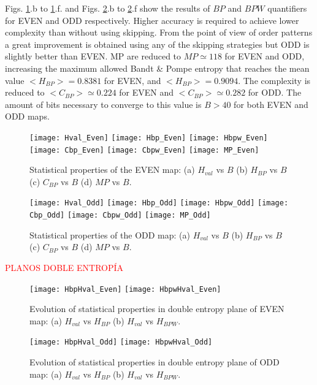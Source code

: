 Figs. \ref{fig:EVEN_QuantiB}.b to \ref{fig:EVEN_QuantiB}.f. and Figs. \ref{fig:ODD_QuantiB}.b to \ref{fig:ODD_QuantiB}.f show the results of $BP$ and $BPW$ quantifiers for EVEN and ODD respectively.
Higher accuracy is required to achieve lower complexity than without using skipping.
From the point of view of order patterns a great improvement is obtained using any of the skipping strategies but ODD is slightly better than EVEN.
MP are reduced to $MP\simeq 118$ for EVEN and  ODD, increasing the maximum allowed Bandt \& Pompe entropy that reaches the mean value $<H_{BP}> = 0.8381$ for EVEN, and $<H_{BP}> = 0.9094$.
The complexity is reduced to $<C_{BP}>\simeq 0.224$ for EVEN and  $<C_{BP}>\simeq 0.282$ for ODD.
The amount of bits necessary to converge to this value is $B>40$ for both EVEN and ODD maps.

\begin{figure}
	\texttt{[image: Hval\_Even]}
	\texttt{[image: Hbp\_Even]}
	\texttt{[image: Hbpw\_Even]}
	\texttt{[image: Cbp\_Even]}
	\texttt{[image: Cbpw\_Even]}
	\texttt{[image: MP\_Even]}
	\caption{Statistical properties of the EVEN map: (a) $H_{val}$ vs $B$ (b) $H_{BP}$ vs $B$ (c) $C_{BP}$ vs $B$ (d) $MP$ vs $B$.}
	\label{fig:EVEN_QuantiB}
\end{figure}

\begin{figure}
	\texttt{[image: Hval\_Odd]}
	\texttt{[image: Hbp\_Odd]}
	\texttt{[image: Hbpw\_Odd]}
	\texttt{[image: Cbp\_Odd]}
	\texttt{[image: Cbpw\_Odd]}
	\texttt{[image: MP\_Odd]}
	\caption{Statistical properties of the ODD map: (a) $H_{val}$ vs $B$ (b) $H_{BP}$ vs $B$ (c) $C_{BP}$ vs $B$ (d) $MP$ vs $B$.}
	\label{fig:ODD_QuantiB}
	\end{figure}

\textcolor{red}{PLANOS DOBLE ENTROPÍA}

\begin{figure}
	\texttt{[image: HbpHval\_Even]}
	\texttt{[image: HbpwHval\_Even]}
	\caption{Evolution of statistical properties in double entropy plane of EVEN map: (a) $H_{val}$ vs $H_{BP}$ (b) $H_{val}$ vs $H_{BPW}$.}
	\label{fig:EVEN_HH}
\end{figure}

\begin{figure}
	\texttt{[image: HbpHval\_Odd]}
	\texttt{[image: HbpwHval\_Odd]}
	\caption{Evolution of statistical properties in double entropy plane of ODD map: (a) $H_{val}$ vs $H_{BP}$ (b) $H_{val}$ vs $H_{BPW}$.}
	\label{fig:ODD_HH}
\end{figure}

